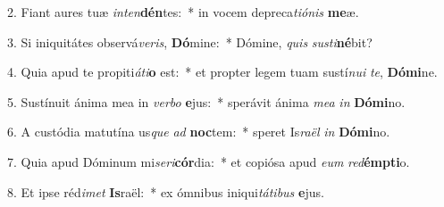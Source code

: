 2. Fiant aures tuæ \textit{in}\textit{ten}\textbf{dén}tes:~*  in vocem depreca\textit{ti}\textit{ó}\textit{nis} \textbf{me}æ.\

3. Si iniquitátes observá\textit{ve}\textit{ris}, \textbf{Dó}mine:~*  Dómine, \textit{quis} \textit{sus}\textit{ti}\textbf{né}bit?\

4. Quia apud te propiti\textit{á}\textit{ti}\textbf{o} est:~*  et propter legem tuam sustí\textit{nu}\textit{i} \textit{te}, \textbf{Dó}\textbf{mi}ne.\

5. Sustínuit ánima mea in \textit{ver}\textit{bo} \textbf{e}jus:~*  sperávit ánima \textit{me}\textit{a} \textit{in} \textbf{Dó}\textbf{mi}no.\

6. A custódia matutína us\textit{que} \textit{ad} \textbf{noc}tem:~*  speret Is\textit{ra}\textit{ël} \textit{in} \textbf{Dó}\textbf{mi}no.\

7. Quia apud Dóminum mi\textit{se}\textit{ri}\textbf{cór}dia:~*  et copiósa apud \textit{e}\textit{um} \textit{red}\textbf{émp}\textbf{ti}o.\

8. Et ipse réd\textit{i}\textit{met} \textbf{Is}raël:~*  ex ómnibus iniqui\textit{tá}\textit{ti}\textit{bus} \textbf{e}jus.\

